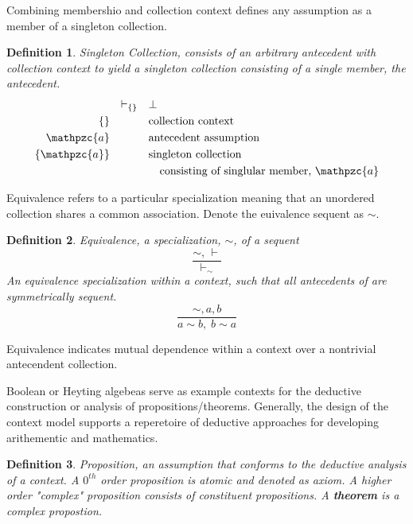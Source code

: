 \documentclass[aps,twocolumn,secnumarabic,nobalancelastpage,amsmath,amssymb,
amsthm,nofootinbib,parskip=full]{revtex4}
\numberwithin{equation}{section}
\newtheorem{definition}{Definition}[section]
\newcommand{\obk}[1]{\mathpzc{#1}}
\begin{document}
Combining membershio and collection context defines any
assumption as a member of a singleton collection.

\begin{definition}{Singleton Collection}\label{def:singletoncollection},
  consists of an arbitrary antecedent with collection context to yield
  a singleton collection consisting of a single member, the antecedent.
  \begin{equation*}
  \begin{array}{rll}
   &\vdash_{\{\}}&\bot \\[3pt]
   \{\}&\quad&\text{collection context} \\[3pt]
   \obk{a}&\quad&\text{antecedent assumption} \\[3pt]
   \{\obk{a}\}&\quad&\text{singleton collection} \\[3pt]
   &&\quad\text{consisting of singlular member, $\obk{a}$}
  \end{array}
  \end{equation*}
\end{definition}

Equivalence refers to a particular specialization meaning
that an unordered collection shares a common association.
Denote the euivalence sequent as $\sim$.

\begin{definition}{Equivalence}\label{def:equivalence},
  a specialization, $\sim$, of a sequent
\begin{equation*}
\frac{\sim,\,\vdash}{\vdash_\sim}
\end{equation*}  
An equivalence specialization within a context,
such that all antecedents of are symmetrically sequent. 
\begin{equation*}
\frac{\sim,a,b}{a\sim b,\;b\sim a}
\end{equation*}  
\end{definition}

Equivalence indicates mutual dependence within a context
over a nontrivial antecendent collection.

Boolean or Heyting algebeas serve as example contexts for
the deductive construction or analysis of propositions/theorems.
Generally, the design of the context model supports a reperetoire of deductive
approaches for developing arithementic and mathematics. 

\begin{definition}{Proposition}\label{def:proposition},
  an assumption that conforms to the deductive analysis of a context.
  A $0^{th}$ order proposition is atomic and denoted as axiom. 
  A higher order "complex" proposition consists of constituent propositions.
  A \textbf{theorem} is a complex propostion.
\end{definition}
\end{document}

